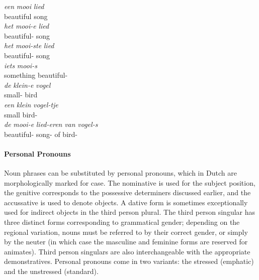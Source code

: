 \begin{exe}
\ex 
\begin{xlist}
\ex\label{gloss:simple_np}
\gll \textit{een} \textit{mooi} \textit{lied}\\
 beautiful song\\
\ex\label{gloss:adjective_definite_n}
\gll \textit{het} \textit{mooi-e} \textit{lied}\\
 beautiful- song\\
\ex\label{gloss:superlative}
\gll \textit{het} \textit{mooi-ste} \textit{lied}\\
 beautiful- song\\
\ex\label{gloss:partitive}
\gll \textit{iets} \textit{mooi-s}\\
something beautiful-\\
\ex\label{gloss:adjective_definite_nn}
\gll \textit{de} \textit{klein-e} \textit{vogel}\\
 small- bird\\
\ex\label{gloss:diminutive}
\gll \textit{een} \textit{klein} \textit{vogel-tje}\\
 small bird-\\
\ex\label{gloss:genitive}
\gll \textit{de} \textit{mooi-e} \textit{lied-eren} \textit{van} \textit{vogel-s}\\
 beautiful- song- of bird-\\
\end{xlist}
\end{exe}

\paragraph{Personal Pronouns}
Noun phrases can be substituted by personal pronouns, which in Dutch are morphologically marked for case.
The nominative is used for the subject position, the genitive corresponds to the possessive determiners discussed earlier, and the accussative is used to denote objects.
A dative form is sometimes exceptionally used for indirect objects in the third person plural.
The third person singular has three distinct forms corresponding to grammatical gender; 
depending on the regional variation, nouns must be referred to by their correct gender, or simply by the neuter (in which case the masculine and feminine forms are reserved for animates).
Third person singulars are also interchangeable with the appropriate demonstratives.
Personal pronouns come in two variants: the stressed (emphatic) and the unstressed (standard).


